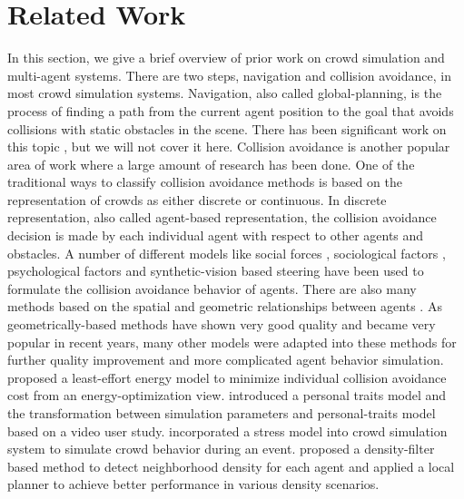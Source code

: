 \documentclass[conference]{acmsiggraph}
\begin{document}
\section{Related Work}

In this section, we give a brief overview of prior work on crowd simulation and multi-agent systems. There are two steps, navigation and collision avoidance, in most crowd simulation systems. Navigation, also called global-planning, is the process of finding a path from the current agent position to the goal that avoids collisions with static obstacles in the scene. There has been significant work on this topic \cite{Funge:1999,Bayanzit:2002,Lamarche:2004,Sud:2007,Sud:2008}, but we will not cover it here.
Collision avoidance is another popular area of work where a large amount of research has been done. One of the traditional ways to classify collision avoidance methods is based on the representation of crowds as either discrete or continuous. In discrete representation, also called agent-based representation, the collision avoidance decision is made by each individual agent with respect to other agents and obstacles. A number of different models like social forces \cite{Helbing:1995,Helbing:2005,Gayle:2009,Sud:2007}, sociological factors \cite{Musse:1997}, psychological factors \cite{Pelechano:2008} and synthetic-vision based steering \cite{Ondrej:2010} have been used to formulate the collision avoidance behavior of agents. There are also many methods based on the spatial and geometric relationships between agents \cite{VDBerg:2008,VDBerg:2009,Guy:2009,VDBerg:2011}. As geometrically-based methods have shown very good quality and became very popular in recent years, many other models were adapted into these methods for further quality improvement and more complicated agent behavior simulation. \cite{Guy:2010} proposed a least-effort energy model to minimize individual collision avoidance cost from an energy-optimization view. \cite{Guy:2011} introduced a personal traits model and the transformation between simulation parameters and personal-traits model based on a video user study. \cite{Kim:2012} incorporated a stress model into crowd simulation system to simulate crowd behavior during an event. \cite{Best:2014} proposed a density-filter based method to detect neighborhood density for each agent and applied a local planner to achieve better performance in various density scenarios. 
\end{document}
